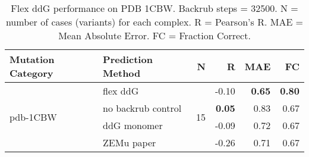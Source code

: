 \begin{table}
  \begin{tabular}{llrrrr}
\toprule
Mutation Category &   Prediction Method &   N &     R &  MAE &   FC \\
\midrule
 \multirow{ 4}{*}{pdb-1CBW} & flex ddG & \multirow{ 4}{*}{15} & -0.10 & \textbf{0.65} & \textbf{0.80}  \\
 & no backrub control & & \textbf{0.05} & 0.83 & 0.67  \\
 & ddG monomer & & -0.09 & 0.72 & 0.67  \\
 & ZEMu paper & & -0.26 & 0.71 & 0.67  \\
\bottomrule
\end{tabular}
  \caption[Flex ddG performance on PDB 1CBW]{
    Flex ddG performance on PDB 1CBW. Backrub steps = 32500. N = number of cases (variants) for each complex. R = Pearson's R. MAE = Mean Absolute Error. FC = Fraction Correct.
  } \label{tab:table-pdb-1CBW}
\end{table}
